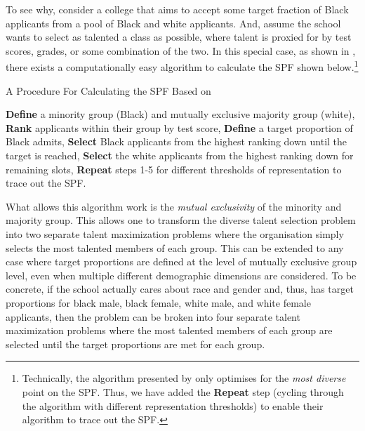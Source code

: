 To see why, consider a college that aims to accept some target fraction of Black applicants from a pool of Black and white applicants. And, assume the school wants to select as talented a class as possible, where talent is proxied for by test scores, grades, or some combination of the two. In this special case, as shown in \textcite{kleinberg2018algorithmic}, there exists a computationally easy algorithm to calculate the SPF shown below.\footnote{Technically, the algorithm presented by \textcite{kleinberg2018algorithmic} only optimises for the \emph{most diverse} point on the SPF. Thus, we have added the \textbf{Repeat} step (cycling through the algorithm with different representation thresholds) to enable their algorithm to trace out the SPF.}

\begin{algorithm}
    \caption{A Procedure For Calculating the SPF Based on \textcite{kleinberg2018algorithmic}}\label{alg:kleinberg}
    \begin{algorithmic}
        \State \textbf{Define} a minority group (Black) and mutually exclusive majority group (white), 
        \State \textbf{Rank} applicants within their group by test score,
        \State \textbf{Define} a target proportion of Black admits,
        \State \textbf{Select} Black applicants from the highest ranking down until the target is reached,
        \State \textbf{Select} the white applicants from the highest ranking down for remaining slots,
        \State \textbf{Repeat} steps 1-5 for different thresholds of representation to trace out the SPF.
    \end{algorithmic}
\end{algorithm}

What allows this algorithm work is the \emph{mutual exclusivity} of the minority and majority group. This allows one to transform the diverse talent selection problem into two separate talent maximization problems where the organisation simply selects the most talented members of each group. This can be extended to any case where target proportions are defined at the level of mutually exclusive group level, even when multiple different demographic dimensions are considered. To be concrete, if the school actually cares about race and gender and, thus, has target proportions for black male, black female, white male, and white female applicants, then the problem can be broken into four separate talent maximization problems where the most talented members of each group are selected until the target proportions are met for each group. 

